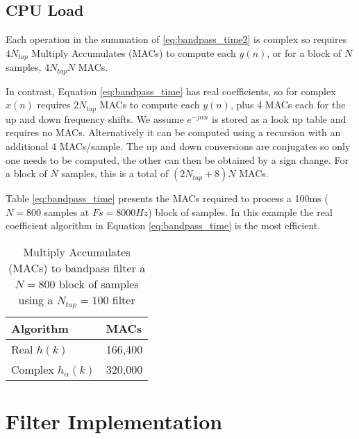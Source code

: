 \documentclass{article}
\begin{document}
\subsection{CPU Load}

Each operation in the summation of \ref{eq:bandpass_time2} is complex so requires $4N_{tap}$ Multiply Accumulates (MACs) to compute each $y(n)$, or for a block of $N$ samples, $4N_{tap}N$ MACs.

In contrast, Equation \ref{eq:bandpass_time} has real coefficients, so for complex $x(n)$ requires $2N_{tap}$ MACs to compute each $y(n)$, plus 4 MACs each for the up and down frequency shifts. We assume $e^{-j \alpha n}$ is stored as a look up table and requires no MACs. Alternatively it can be computed using a recursion with an additional 4 MACs/sample. The up and down conversions are conjugates so only one needs to be computed, the other can then be obtained by a sign change. For a block of $N$ samples, this is a total of $(2N_{tap}+8)N$ MACs.

Table \ref{eq:bandpass_time} presents the MACs required to process a 100ms ($N=800$ samples at $Fs=8000 Hz$) block of samples.  In this example the real coefficient algorithm in Equation \ref{eq:bandpass_time} is the most efficient.

\begin{table}[h]
\centering
\begin{tabular}{l l }
 \hline
 Algorithm & MACs \\
 \hline
 Real $h(k)$ & 166,400 \\
 Complex $h_{\alpha}(k)$  & 320,000 \\ 
 \hline
\end{tabular}
\caption{Multiply Accumulates (MACs) to bandpass filter a $N=800$ block of samples using a $N_{tap}=100$ filter}
\label{table:ratek1_mean_E}
\end{table}

\section{Filter Implementation}
\end{document}
